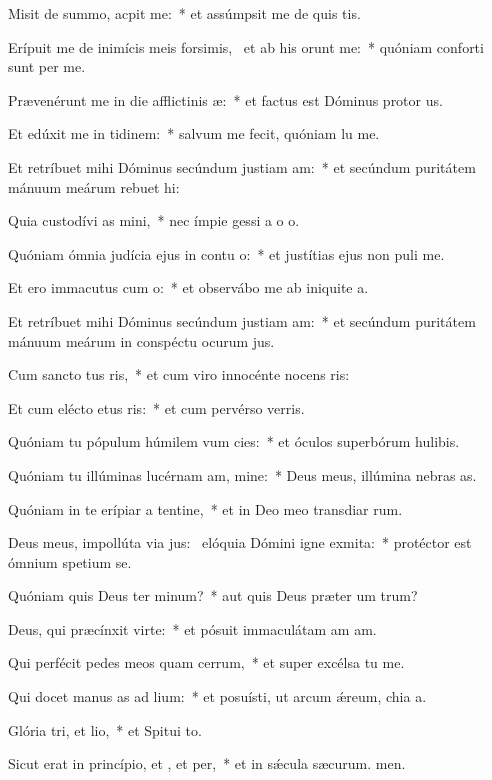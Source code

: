 \item Misit de summo,  acpit me:~* et assúmpsit me de quis tis.
\item Erípuit me de inimícis meis forsimis,~\pscross{} et ab his  orunt me:~* quóniam conforti sunt per me.
\item Prævenérunt me in die afflictinis æ:~* et factus est Dóminus protor us.
\item Et edúxit me in tidinem:~* salvum me fecit, quóniam lu me.
\item Et retríbuet mihi Dóminus secúndum justiam am:~* et secúndum puritátem mánuum meárum rebuet hi:
\item Quia custodívi as mini,~* nec ímpie gessi a o o.
\item Quóniam ómnia judícia ejus in contu o:~* et justítias ejus non puli  me.
\item Et ero immacutus cum o:~* et observábo me ab iniquite a.
\item Et retríbuet mihi Dóminus secúndum justiam am:~* et secúndum puritátem mánuum meárum in conspéctu ocurum jus.
\item Cum sancto tus ris,~* et cum viro innocénte nocens ris:
\item Et cum elécto etus ris:~* et cum pervérso verris.
\item Quóniam tu pópulum húmilem vum cies:~* et óculos superbórum hulibis.
\item Quóniam tu illúminas lucérnam am, mine:~* Deus meus, illúmina nebras as.
\item Quóniam in te erípiar a tentine,~* et in Deo meo transdiar rum.
\item Deus meus, impollúta via jus:~\pscross{} elóquia Dómini igne exmita:~* protéctor est ómnium spetium  se.
\item Quóniam quis Deus ter minum?~* aut quis Deus præter um trum?
\item Deus, qui præcínxit  virte:~* et pósuit immaculátam am am.
\item Qui perfécit pedes meos quam cerrum,~* et super excélsa tu me.
\item Qui docet manus as ad lium:~* et posuísti, ut arcum ǽreum, chia a.
\item Glória tri, et lio,~* et Spitui to.
\item Sicut erat in princípio, et , et per,~* et in sǽcula sæcurum. men.

